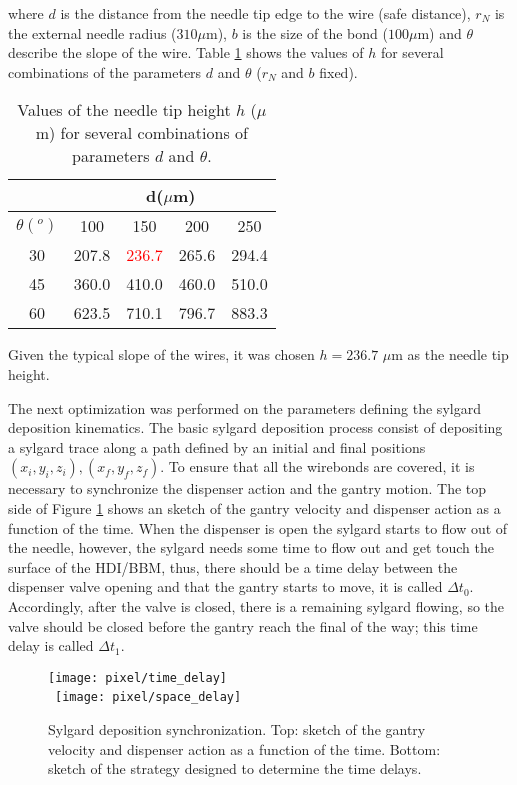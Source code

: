 \noindent where $d$ is the distance from the needle tip edge to the wire (safe distance), $r_N$ is the external needle radius ($310 \mu$m), $b$ is the size of the bond ($100 \mu$m) and $\theta$ describe the slope of the wire. Table \ref{tab:needle_tip_heights} shows the values of $h$ for several combinations of the parameters $d$ and $\theta$ ($r_N$ and $b$ fixed).
\begin{table}
  \centering
  \begin{tabular}{ c  c  c  c  c } \hline
               &\multicolumn{4}{c}{d($\mu$m)}\\\hline
  $\theta(^o)$ & 100   & 150   & 200   & 250 \\\hline
    30         & 207.8 & \textcolor{red}{236.7} & 265.6 & 294.4 \\
    45         & 360.0 & 410.0 & 460.0 & 510.0 \\
    60         & 623.5 & 710.1 & 796.7 & 883.3 \\\hline
  \end{tabular}
  \caption{Values of the needle tip height $h$ ($\mu$m) for several combinations of parameters $d$ and $\theta$. }\label{tab:needle_tip_heights}
\end{table}

Given the typical slope of the wires, it was chosen $h=236.7$ $\mu$m as the needle tip height.   

The next optimization was performed on the parameters defining the sylgard deposition kinematics. The basic sylgard deposition process consist of depositing a sylgard trace along a path defined by an initial and final positions $(x_i, y_i, z_i), (x_f, y_f, z_f)$. To ensure that all the wirebonds are covered, it is necessary to synchronize the dispenser action and the gantry motion. The top side of Figure \ref{fig:sylgard_synch} shows an sketch of the gantry velocity and dispenser action as a function of the time. When the dispenser is open the sylgard starts to flow out of the needle, however, the sylgard needs some time to flow out and get touch the surface of the HDI/BBM, thus, there should be a time delay between the dispenser valve opening and that the gantry starts to move, it is called $\Delta t_0$. Accordingly, after the valve is closed, there is a remaining sylgard flowing, so the valve should be  closed before the gantry reach the final of the way; this time delay is called $\Delta t_1$.

\begin{figure}[h]
  \begin{center}
    \texttt{[image: pixel/time\_delay]}\\\ 
    \texttt{[image: pixel/space\_delay]}
    \caption[Sylgard deposition synchronization.]{Sylgard deposition synchronization. Top: sketch of the gantry velocity and dispenser action as a function of the time. Bottom: sketch of the strategy designed to determine the time delays.}\label{fig:sylgard_synch}
  \end{center}
\end{figure}


